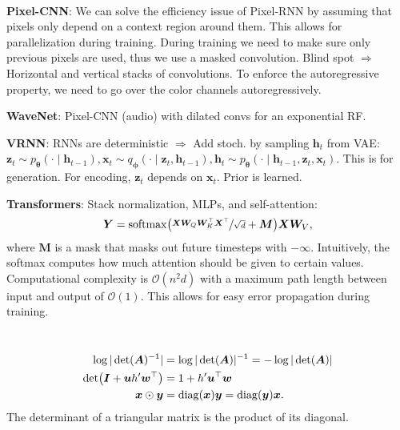 \documentclass{article}
\newcommand{\lft}{\mathopen{}\mathclose\bgroup\left}
\newcommand{\rgt}{\aftergroup\egroup\right}
\renewcommand{\vec}[1]{\bm{#1}}
\newcommand{\mat}[1]{\bm{#1}}
\newenvironment{topic}[1]
{\textbf{\sffamily \colorbox{black}{\rlap{\textbf{\textcolor{white}{#1}}}\hspace{\linewidth}\hspace{-2\fboxsep}}} \\ \vspace{0.2cm}}
{}
\begin{document}
\begin{multicols*}{2}
\begin{topic}{Autoregressive models}
        \textbf{Pixel-CNN}: We can solve the efficiency issue of Pixel-RNN by assuming that pixels
        only depend on a context region around them. This allows for parallelization during training.
        During training we need to make sure only previous pixels are used, thus we use a masked
        convolution. Blind spot $\Rightarrow$ Horizontal and vertical stacks of
        convolutions. To enforce the autoregressive property, we need to go over the color channels
        autoregressively.

        \textbf{WaveNet}: Pixel-CNN (audio) with dilated convs for an exponential RF.

        \textbf{VRNN}: RNNs are deterministic $\Rightarrow$ Add stoch. by sampling $\vec{h}_t$ from VAE:
        $\vec{z}_t \sim p_{\vec{\theta}}(\cdot \mid \vec{h}_{t-1}), \vec{x}_t \sim q_{\vec{\phi}}(\cdot \mid \vec{z}_t, \vec{h}_{t-1}), \vec{h}_t \sim p_{\vec{\theta}}(\cdot \mid \vec{h}_{t-1}, \vec{z}_t, \vec{x}_t)$. This is for generation. For encoding, $\vec{z}_t$ depends on $\vec{x}_t$. Prior is learned.

        \textbf{Transformers}: Stack normalization, MLPs, and self-attention: \[
            \mat{Y} = \mathrm{softmax}\lft( \nicefrac{\mat{X} \mat{W}_Q \mat{W}_K^\top \mat{X}^\top}{\sqrt{d}} + \mat{M} \rgt) \mat{X} \mat{W}_V,
        \]
        where $\mat{M}$ is a mask that masks out future timesteps with $-\infty$. Intuitively, the softmax
        computes how much attention should be given to certain values. Computational complexity is
        $\mathcal{O}(n^2d)$ with a maximum path length between input and output of $\mathcal{O}(1)$. This
        allows for easy error propagation during training.
    \end{topic}

    \begin{topic}{Normalizing flow}
        \begin{align*}
            \log |\det(\mat{A})^{-1}|                          & = \log |\det(\mat{A})|^{-1} = -\log |\det(\mat{A})|                \\
            \det \lft( \mat{I} + \vec{u} h' \vec{w}^\top \rgt) & = 1 + h' \vec{u}^\top \vec{w}                                      \\
            \vec{x} \odot \vec{y}                              & = \mathrm{diag}(\vec{x}) \vec{y} = \mathrm{diag}(\vec{y}) \vec{x}.
        \end{align*}
        The determinant of a triangular matrix is the product of its diagonal.


\end{topic}
\end{multicols*}
\end{document}
